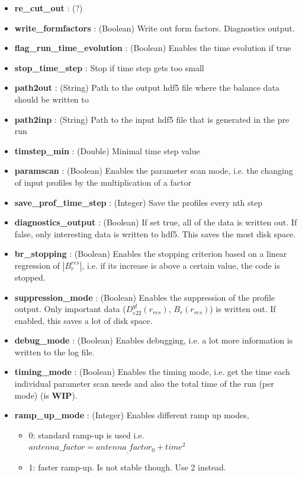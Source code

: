 \documentclass{article}
\begin{document}
\begin{itemize}
	\item \textbf{re\_cut\_out} : (?)
	\item \textbf{write\_formfactors} : (Boolean) Write out form factors. Diagnostics output.
	\item \textbf{flag\_run\_time\_evolution} : (Boolean) Enables the time evolution if true
	\item \textbf{stop\_time\_step} : Stop if time step gets too small
	\item \textbf{path2out} : (String) Path to the output hdf5 file where the balance data should be written to
	\item \textbf{path2inp }: (String) Path to the input hdf5 file that is generated in the pre run
	\item \textbf{timstep\_min} : (Double) Minimal time step value
	\item \textbf{paramscan} : (Boolean) Enables the parameter scan mode, i.e. the changing of input profiles by the multiplication of a factor
	\item \textbf{save\_prof\_time\_step} : (Integer) Save the profiles every nth step
	\item \textbf{diagnostics\_output} : (Boolean) If set true, all of the data is written out. If false, only interesting data is written to hdf5. This saves the most disk space.
	\item \textbf{br\_stopping} : (Boolean) Enables the stopping criterion based on a linear regression of $|B_r^{res}|$, i.e. if its increase is above a certain value, the code is stopped.
	\item \textbf{suppression\_mode} : (Boolean) Enables the suppression of the profile output. Only important data ($D_{e22}^{ql}(r_{res})$, $B_r(r_{res})$) is written out. If enabled, this saves a lot of disk space.
	\item \textbf{debug\_mode} : (Boolean) Enables debugging, i.e. a lot more information is written to the log file.
	\item \textbf{timing\_mode} : (Boolean) Enables the timing mode, i.e. get the time each individual parameter scan needs and also the total time of the run (per mode) (is \textbf{WIP}).
	\item \textbf{ramp\_up\_mode} : (Integer) Enables different ramp up modes, 
	\begin{itemize}
		\item 0: standard ramp-up is used i.e. $antenna\_factor = antenna_\_factor_0 + time^2$
		\item 1: faster ramp-up. Is not stable though. Use 2 instead.

\end{itemize}
\end{itemize}
\end{document}
